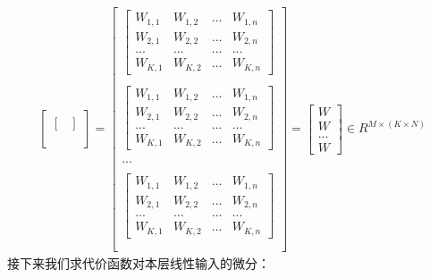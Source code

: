 \documentclass[UTF8]{article}
\begin{document}
\begin{equation}
\begin{aligned}
\begin{bmatrix}
\begin{bmatrix}
 \end{bmatrix} \\ \\
\end{bmatrix}
=\begin{bmatrix}
\begin{bmatrix}
 W_{1,1} & W_{1,2} & ... & W_{1,n} \\
 W_{2,1} & W_{2,2} & ... & W_{2,n} \\
 ... & ... & ... & ... \\
 W_{K,1} & W_{K,2} & ... & W_{K,n}
 \end{bmatrix} \\ \\
\begin{bmatrix}
 W_{1,1} & W_{1,2} & ... & W_{1,n} \\
 W_{2,1} & W_{2,2} & ... & W_{2,n} \\
 ... & ... & ... & ... \\
 W_{K,1} & W_{K,2} & ... & W_{K,n}
 \end{bmatrix} \\ \\
 ... \\ \\
 \begin{bmatrix}
 W_{1,1} & W_{1,2} & ... & W_{1,n} \\
 W_{2,1} & W_{2,2} & ... & W_{2,n} \\
 ... & ... & ... & ... \\
 W_{K,1} & W_{K,2} & ... & W_{K,n}
 \end{bmatrix} \\ \\
\end{bmatrix}=\begin{bmatrix}
W \\
W \\
... \\
W
\end{bmatrix} \in R^{M \times (K \times N)}
\end{aligned}
\label{mlp-leaky-relu-pZ-pX-def}
\end{equation}
接下来我们求代价函数对本层线性输入的微分：
\end{document}
